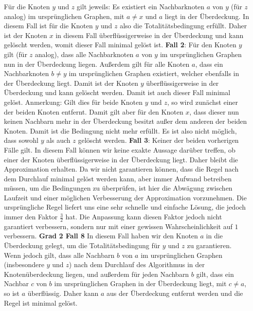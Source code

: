 \documentclass[12pt,onecolumn, notitlepage]{scrartcl}
\begin{document}
Für die Knoten $y$ und $z$ gilt jeweils: Es existiert ein Nachbarknoten $a$ von $y$ (für $z$ analog) im ursprünglichen Graphen, mit $a \neq x$ und $a$ liegt in der Überdeckung. In diesem Fall ist für die Knoten $y$ und $z$ also die Totalitätsbedingung erfüllt. Daher ist der Knoten $x$ in diesem Fall überflüssigerweise in der Überdeckung und kann gelöscht werden, womit dieser Fall minimal gelöst ist. \newline\newline
\textbf{Fall 2}: \newline
Für den Knoten $y$ gilt (für $z$ analog), dass alle Nachbarknoten $a$ von $y$ im ursprünglichen Graphen nun in der Überdeckung liegen. Außerdem gilt für alle Knoten $a$, dass ein Nachbarknoten $b \neq y$ im ursprünglichen Graphen existiert, welcher ebenfalls in der Überdeckung liegt. Damit ist der Knoten $y$ überflüssigerweise in der Überdeckung und kann gelöscht werden. Damit ist auch dieser Fall minimal gelöst.\newline
Anmerkung: Gilt dies für beide Knoten $y$ und $z$, so wird zunächst einer der beiden Knoten entfernt. Damit gilt aber für den Knoten $x$, dass dieser nun keinen Nachbarn mehr in der Überdeckung besitzt außer dem anderen der beiden Knoten. Damit ist die Bedingung nicht mehr erfüllt. Es ist also nicht möglich, dass sowohl $y$ als auch $z$ gelöscht werden. \newline\newline
\textbf{Fall 3}: \newline
Keiner der beiden vorherigen Fälle gilt. In diesem Fall können wir keine exakte Aussage darüber treffen, ob einer der Knoten überflüssigerweise in der Überdeckung liegt. Daher bleibt die Approximation erhalten.\newline
Da wir nicht garantieren können, dass die Regel nach dem Durchlauf minimal gelöst werden kann, aber immer Aufwand betreiben müssen, um die Bedingungen zu überprüfen, ist hier die Abwägung zwischen Laufzeit und einer möglichen Verbesserung der Approximation vorzunehmen. Die ursprüngliche Regel liefert uns eine sehr schnelle und einfache Lösung, die jedoch immer den Faktor $\frac{3}{2}$ hat. Die Anpassung kann diesen Faktor jedoch nicht garantiert verbessern, sondern nur mit einer gewissen Wahrscheinlichkeit auf $1$ verbessern. \newline \newline
\textbf{Grad 2 Fall 8} \newline
In diesem Fall haben wir den Knoten $a$ in die Überdeckung gelegt, um die Totalitätsbedingung für $y$ und $z$ zu garantieren. Wenn jedoch gilt, dass alle Nachbarn $b$ von $a$ im ursprünglichen Graphen (insbesondere $y$ und $z$) nach dem Durchlauf des Algorithmus in der Knotenüberdeckung liegen, und außerdem für jeden Nachbarn $b$ gilt, dass ein Nachbar $c$ von $b$ im ursprünglichen Graphen in der Überdeckung liegt, mit $c \neq a$, so ist $a$ überflüssig. Daher kann $a$ aus der Überdeckung entfernt werden und die Regel ist minimal gelöst.\newline
\end{document}

